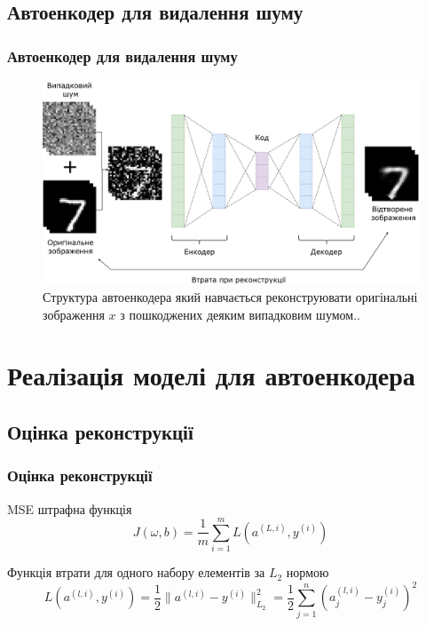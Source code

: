 \documentclass{beamer}
\newcounter{e}
\newcommand{\ith}{^{(i)}}
\begin{document}
	\subsection{Автоенкодер для видалення шуму}
	\begin{frame}
		\frametitle{Автоенкодер для видалення шуму}
		
		\begin{figure}[H]
			\centering
			\includegraphics[width=1\textwidth]{../resources/dae.pdf}
			\caption{
				Структура автоенкодера який навчається реконструювати оригінальні зображення $x$ з пошкоджених деяким випадковим шумом..}
			\label{fig:danoising-autoencoder}
		\end{figure}
	\end{frame}
	\section{Реалізація моделі для автоенкодера}

	\subsection{Оцінка реконструкції}
	\begin{frame}
		\frametitle{Оцінка реконструкції}
		\begin{block}{MSE штрафна функція}
			\begin{equation}
				\label{eq:cost-function}
				J(\omega, b) =  \frac{1}{m}  \sum_{i=1}^{m} L(a^{(L, i)}, y\ith)
			\end{equation}
		\end{block}
		\begin{block}{Функція втрати для одного набору елементів за $L_2$ нормою}
			\begin{equation}
				\label{eq:loss-function}
				L(a^{(l, i)}, y\ith)  =  \frac{1}{2}  \| a^{(l, i)}  - y\ith \|_{L_2}^{2} = \frac{1}{2} \sum_{j=1}^{n}  (a^{(l, i)}_j -  y\ith_j)^2
			\end{equation}
		\end{block}
	\end{frame}
	
\end{document}
